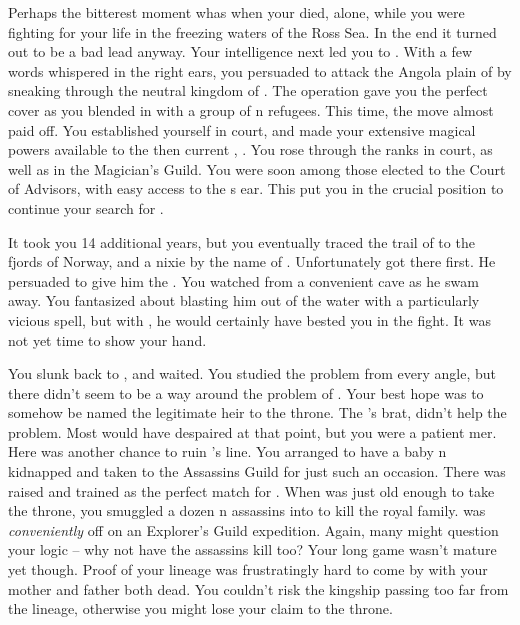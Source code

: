 \documentclass[char]{NeptuneBall}
\begin{document}
Perhaps the bitterest moment whas when your \cMother{\parent} died, alone, while you were fighting for your life in the freezing waters of the Ross Sea. In the end it turned out to be a bad lead anyway. Your intelligence next led you to \pAtlantis{}. With a few words whispered in the right ears, you persuaded \pPacifica{} to attack the Angola plain of \pAtlantis{} by sneaking through the neutral kingdom of \pIndia{}. The operation gave you the perfect cover as you blended in with a group of \pAtlantis{}n refugees. This time, the move almost paid off. You established yourself in court, and made your extensive magical powers available to the then current \cExKing{\King}, \cExKing{}. You rose through the ranks in court, as well as in the Magician's Guild. You were soon among those elected to the Court of Advisors, with easy access to the \cExKing{\King}s ear. This put you in the crucial position to continue your search for \iTrident{\MYname}.

It took you 14 additional years, but you eventually traced the trail of  \iTrident{\MYname} to the fjords of Norway, and a nixie by the name of \cNixie{}. Unfortunately \cExKing{} got there first. He persuaded \cNixie{} to give him the \iTrident{\MYname}. You watched from a convenient cave as he swam away. You fantasized about blasting him out of the water with a particularly vicious spell, but with \iTrident{\MYname}, he would certainly have bested you in the fight. It was not yet time to show your hand.

You slunk back to \pAtlantis{}, and waited. You studied the problem from every angle, but there didn't seem to be a way around the problem of \iTrident{\MYname}. Your best hope was to somehow be named the legitimate heir to the throne. The \cExKing{\King}'s brat, \cKing{} didn't help the problem. Most would have despaired at that point, but you were a patient mer\cManta{\human}. Here was another chance to ruin \cExExKing{}'s line. You arranged to have a baby \pAtlantis{}n \cQueen{\kid} kidnapped and taken to the Assassins Guild for just such an occasion. There \cQueen{\they} was raised and trained as the perfect match for \cKing{}. When \cKing{} was just old enough to take the throne, you smuggled a dozen \pPacifica{}n assassins into \pAtlantis{} to kill the royal family. \cKing{} was \emph{conveniently} off on an Explorer's Guild expedition. Again, many might question your logic -- why not have the assassins kill \cKing{} too? Your long game wasn't mature yet though. Proof of your lineage was frustratingly hard to come by with your mother and father both dead. You couldn't risk the kingship passing too far from the \cExExKing{} lineage, otherwise you might lose your claim to the throne.
\end{document}
